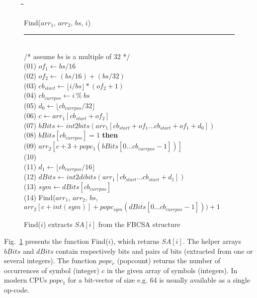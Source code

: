 \documentclass{cai}
\newcommand{\uassign}{\leftarrow}
\newcommand{\uif}{{\bf if}\xspace}
\newcommand{\uthen}{{\bf then}\xspace}
\newcommand{\uelse}{{\bf else}\xspace}
\newcommand{\ureturn}{{\bf return}\xspace}
\newcounter{lineno}
\newcommand{\utab}{\qquad}
\newcommand{\startindent}{\hspace{0.8em}}
\newenvironment{code}{\setcounter{lineno}{0}\begin{tabbing}
\utab\=\utab\=\utab\=\utab\=\utab\=\utab\=\utab\=\utab\=\utab\=\utab\=\utab\=\utab\=\utab\= \kill
}
{
\end{tabbing}\vspace{-2mm}
}
\newcommand{\floor}[1]{{\lfloor #1 \rfloor}}
\begin{document}
\begin{figure}
\begin{code}
Find($arr_1$, $arr_2$, $bs$, $i$) \\
\rule{\textwidth}{0.3mm} \\
/* assume $bs$ is a multiple of 32 */ \\
(01) \startindent $of_1 \uassign bs / 16$ \\
(02) \startindent $of_2 \uassign (bs / 16) + (bs / 32)$ \\
(03) \startindent $cb_{start} \uassign \floor{i / bs} * (of_2 + 1)$ \\
(04) \startindent $cb_{currpos} \uassign i\ \%\ bs$ \\
(05) \startindent $d_0 \uassign \floor{cb_{currpos} / 32}$ \\
(06) \startindent $c \uassign arr_1[cb_{start} + of_{2}]$ \\
(07) \startindent $bBits \uassign int2bits(arr_1[cb_{start} + of_{1} \ldots cb_{start} + of_{1} + d_0])$ \\
(08) \startindent \uif $bBits[cb_{currpos}] = 1$ \uthen \\
(09) \startindent \>\>\ureturn $arr_2[c + 3 + popc_1(bBits[0 \dots cb_{currpos} - 1])]$ \\
(10) \startindent \uelse \\
(11) \startindent \>\>$d_1 \uassign \floor{cb_{currpos} / 16}$ \\
(12) \startindent \>\>$dBits \uassign int2dibits(arr_1[cb_{start} \ldots cb_{start} + d_1])$ \\
(13) \startindent \>\>$sym \uassign dBits[cb_{currpos}]$ \\
(14) \startindent \>\>\ureturn Find($arr_1$, $arr_2$, $bs$, \\
  \hspace{5.5em} $arr_2[c + int(sym)] + popc_{sym}(dBits[0 \ldots cb_{currpos}-1])) + 1$ \\
\end{code}
\caption{Find($i$) extracts $SA[i]$ from the FBCSA structure}
\label{fig:FBSA_access}
\end{figure}


Fig.~\ref{fig:FBSA_access} presents the function Find($i$), 
which returns $SA[i]$.
The helper arrays $bBits$ and $dBits$ contain respectively bits and 
pairs of bits (extracted from one or several integers).
The function $popc_c$ (popcount) returns the number of occurrences 
of symbol (integer) $c$ in the given array of symbols (integers).
In modern CPUs $popc_1$ for a bit-vector of size e.g. 64 is usually 
available as a single op-code.
\end{document}

